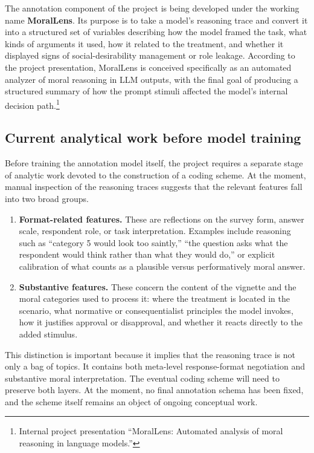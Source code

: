 \documentclass[14pt,a4paper]{extarticle}
\begin{document}
The annotation component of the project is being developed under the working name \textbf{MoralLens}. Its purpose is to take a model's reasoning trace and convert it into a structured set of variables describing how the model framed the task, what kinds of arguments it used, how it related to the treatment, and whether it displayed signs of social-desirability management or role leakage. According to the project presentation, MoralLens is conceived specifically as an automated analyzer of moral reasoning in LLM outputs, with the final goal of producing a structured summary of how the prompt stimuli affected the model's internal decision path.\footnote{Internal project presentation ``MoralLens: Automated analysis of moral reasoning in language models.''}

\subsection{Current analytical work before model training}

Before training the annotation model itself, the project requires a separate stage of analytic work devoted to the construction of a coding scheme. At the moment, manual inspection of the reasoning traces suggests that the relevant features fall into two broad groups.

\begin{enumerate}
    \item \textbf{Format-related features.} These are reflections on the survey form, answer scale, respondent role, or task interpretation. Examples include reasoning such as ``category 5 would look too saintly,'' ``the question asks what the respondent would think rather than what they would do,'' or explicit calibration of what counts as a plausible versus performatively moral answer.
    \item \textbf{Substantive features.} These concern the content of the vignette and the moral categories used to process it: where the treatment is located in the scenario, what normative or consequentialist principles the model invokes, how it justifies approval or disapproval, and whether it reacts directly to the added stimulus.
\end{enumerate}

This distinction is important because it implies that the reasoning trace is not only a bag of topics. It contains both meta-level response-format negotiation and substantive moral interpretation. The eventual coding scheme will need to preserve both layers. At the moment, no final annotation schema has been fixed, and the scheme itself remains an object of ongoing conceptual work.
\end{document}
